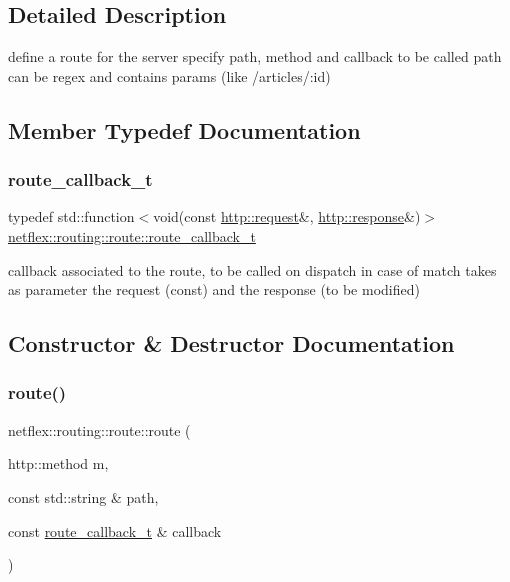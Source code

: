 \subsection{Detailed Description}
define a route for the server specify path, method and callback to be called path can be regex and contains params (like /articles/\+:id) 

\subsection{Member Typedef Documentation}
\mbox{\label{classnetflex_1_1routing_1_1route_a5af1479be27de20f7c395bf2fb0f3639}} 
\subsubsection{\texorpdfstring{route\+\_\+callback\+\_\+t}{route\_callback\_t}}
{\footnotesize\ttfamily typedef std\+::function$<$void(const \hyperlink{classnetflex_1_1http_1_1request}{http\+::request}\&, \hyperlink{classnetflex_1_1http_1_1response}{http\+::response}\&)$>$ \hyperlink{classnetflex_1_1routing_1_1route_a5af1479be27de20f7c395bf2fb0f3639}{netflex\+::routing\+::route\+::route\+\_\+callback\+\_\+t}}

callback associated to the route, to be called on dispatch in case of match takes as parameter the request (const) and the response (to be modified) 

\subsection{Constructor \& Destructor Documentation}
\mbox{\label{classnetflex_1_1routing_1_1route_a15868bae2313eaf230380fbb6266a153}} 
\subsubsection{\texorpdfstring{route()}{route()}}
{\footnotesize\ttfamily netflex\+::routing\+::route\+::route (\begin{DoxyParamCaption}\item[{http\+::method}]{m,  }\item[{const std\+::string \&}]{path,  }\item[{const \hyperlink{classnetflex_1_1routing_1_1route_a5af1479be27de20f7c395bf2fb0f3639}{route\+\_\+callback\+\_\+t} \&}]{callback }\end{DoxyParamCaption})}


